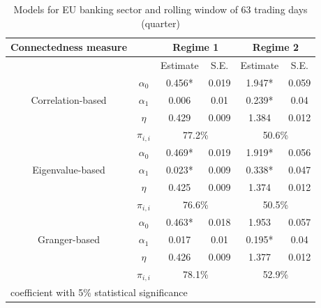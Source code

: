 \documentclass{article}
\begin{document}
\begin{table}
\caption{Models for EU banking sector and rolling window of 63 trading days (quarter)}
\begin{tabular}{cccccc}
  \toprule
   Connectedness measure &  & \multicolumn{2}{c}{\bfseries Regime 1} & \multicolumn{2}{c}{\bfseries Regime 2}  \\
   \hline
   & & Estimate & S.E. & Estimate & S.E. \\
   \hline
   \multirow{3}{*}[\normalbaselineskip]{Correlation-based} & $\alpha_0$ & 0.456* & 0.019 & 1.947*  & 0.059 \\
    & $\alpha_1$ & 0.006 & 0.01 & 0.239* & 0.04 \\
    & $\eta$ & 0.429 & 0.009 & 1.384 & 0.012 \\
    & $\pi_{i,i}$ &  \multicolumn{2}{c}{77.2\%} & \multicolumn{2}{c}{50.6\%}\\
    \hline
    \multirow{3}{*}[\normalbaselineskip]{Eigenvalue-based} & $\alpha_0$ & 0.469* & 0.019 & 1.919*  & 0.056 \\
    & $\alpha_1$ & 0.023* & 0.009 & 0.338* & 0.047 \\
    & $\eta$ & 0.425 & 0.009 & 1.374 & 0.012 \\
    & $\pi_{i,i}$ &  \multicolumn{2}{c}{76.6\%} & \multicolumn{2}{c}{50.5\%}\\
    \hline
    \multirow{3}{*}[\normalbaselineskip]{Granger-based} & $\alpha_0$ & 0.463* & 0.018 & 1.953  & 0.057 \\
    & $\alpha_1$ & 0.017 & 0.01 & 0.195* & 0.04 \\
    & $\eta$ & 0.426 & 0.009 & 1.377 & 0.012 \\
    & $\pi_{i,i}$ &  \multicolumn{2}{c}{78.1\%} & \multicolumn{2}{c}{52.9\%}\\
    \hline
  \multicolumn{6}{l}{\footnotesize * coefficient with 5\% statistical significance} \\
  \hline
\end{tabular}
\end{table}
\end{document}
